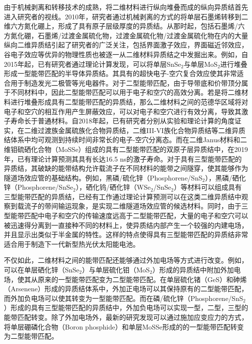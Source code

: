     由于机械剥离和转移技术的成熟，将二维材料进行纵向堆叠而成的纵向异质结首先进入研究者的视线。2010年，研究者通过机械剥离的方式的将单层石墨烯转移到二维六方氮化硼上，形成了具有原子层级厚度的异质结。从那时起，包括石墨烯/六方氮化硼，石墨烯/过渡金属硫化物，过渡金属硫化物/过渡金属硫化物在内的大量纵向二维异质结引起了研究者的广泛关注，包括界面激子效应，界面磁近邻效应，谷电子效应等优异的物理性质也被逐一从二维材料异质结之中发掘出来。例如，自2015年起，已有研究者通过理论计算发现，可以将单层SnSe$_2$与单层MoS$_2$进行堆叠形成一型能带匹配的半导体异质结。其具有的超快电子-空穴复合效应使其非常适合用于制造发光二极管等光电器件。对于二型能带匹配，由于导带底和价带顶分属于不同材料中，因此二型能带匹配可以用于电子和空穴的高效分离。若是将二维材料进行堆叠形成具有二型能带匹配的异质结，那么二维材料之间的范德华区域将对电子和空穴的相互作用产生屏蔽效应，可以对电子和空穴进行有效分离，导致其激子寿命长于普通材料。自2018年起，已有研究者分别从实验和理论计算的角度证实，在二维过渡族金属硫族化合物异质结，二维III-VI族化合物异质结等二维异质结体系中均可观测到持续时间非常长的电子-空穴分离态。而在二维Janus材料和二维钼硫硒化合物（MoSSe）组成的具有二型能带匹配的双原子层异质结中，在2019年，已有理论计算预测其具有长达16.5 ns的激子寿命。对于具有三型能带匹配的异质结，其破缺的能带结构允许载流子在不同材料的能带之间隧穿，使其能够作为隧道场效应管的基础结构。例如，黑磷/硫化锌（Phosphorene/SnS$_2$），黑磷/硒化锌（Phosphorene/SnSe$_2$），硒化钨/硒化锌（WSe$_2$/SnSe$_2$）等材料可以组成具有三型能带匹配的异质结，已经有工作通过理论计算预测可以在这类二维异质结中观察到载流子的带间输运现象，是实现二维隧道场效应管的候选材料。同时，由于三型能带匹配中电子和空穴的传输速度远高于二型能带匹配，大量的电子和空穴可以被迅速得分离到一直接种不同的材料上，使异质结内部产生一个较强的内建电场，并且显示出类似于半金属的特性。这样的特点使得具有三型能带匹配的异质结非常适合用于制造下一代新型热光伏太阳能电池。

    不仅如此，二维材料之间的能带匹配还能够通过外加电场等方式进行改变。例如，可以在单层硒化锌（SnSe$_2$）与单层硫化钼（MoS$_2$）形成的异质结中附加外加电场，使其从原来的一型能带匹配变为二型能带匹配。在单层硫化锗（GeS）和砷烯（Arsenene）形成的异质结体系中，外加正电场可以其保持原有的二型能带匹配，而外加负电场可以使其转变为一型能带匹配。而在磷/硫化锌（Phosphorene/SnS$_2$）形成的具有三型能带匹配的异质结中，外加负电场可以实现一型，二型，三型的能带匹配转变。除了外加电场外，最新的研究发现可以通过施加应变应力的方式，将单层硼磷化合物（Boron phosphide）和单层MoSSe形成的的一型能带匹配转变为二型能带匹配。

